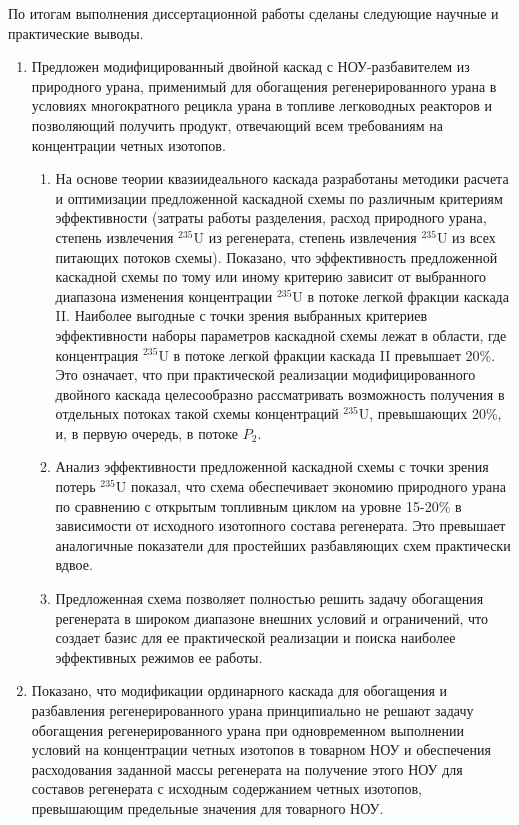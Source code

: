 По итогам выполнения диссертационной работы сделаны следующие научные и практические выводы.
\begin{enumerate}[label=\Roman*.]
\item Предложен модифицированный двойной каскад с НОУ-разбавителем из природного урана, применимый  для обогащения регенерированного урана в условиях многократного рецикла урана в топливе легководных реакторов и позволяющий получить продукт, отвечающий всем требованиям на концентрации четных изотопов. 

\begin{enumerate}
    \item На основе теории квазиидеального каскада разработаны методики расчета и оптимизации предложенной каскадной схемы по различным критериям эффективности (затраты работы разделения, расход природного урана, степень извлечения $^{235}$U из регенерата, степень извлечения $^{235}$U из всех питающих потоков схемы). Показано, что эффективность предложенной каскадной схемы по тому или иному критерию зависит от выбранного диапазона изменения концентрации $^{235}$U в потоке легкой фракции каскада II. Наиболее выгодные с точки зрения выбранных критериев эффективности наборы параметров каскадной схемы лежат в области, где концентрация $^{235}$U в потоке легкой фракции каскада II превышает 20\%. Это означает, что при практической реализации модифицированного двойного каскада целесообразно рассматривать возможность получения в отдельных потоках такой схемы концентраций $^{235}$U, превышающих 20\%, и, в первую очередь, в потоке $P_2$. 
    \item Анализ эффективности предложенной каскадной схемы с точки зрения потерь $^{235}$U показал, что схема обеспечивает экономию природного урана по сравнению с открытым топливным циклом на уровне 15-20\% в зависимости от исходного изотопного состава регенерата. Это превышает аналогичные показатели для простейших разбавляющих схем практически вдвое.
    \item Предложенная схема позволяет полностью решить задачу обогащения регенерата в широком диапазоне внешних условий и ограничений, что создает базис для ее практической реализации и поиска наиболее эффективных режимов ее работы.
\end{enumerate}

\item Показано, что модификации ординарного каскада для обогащения и разбавления регенерированного урана принципиально не решают задачу обогащения регенерированного урана при одновременном выполнении условий на концентрации четных изотопов в товарном НОУ и обеспечения расходования заданной массы регенерата на получение этого НОУ для составов регенерата с исходным содержанием четных изотопов, превышающим предельные значения для товарного НОУ. 


\end{enumerate}
